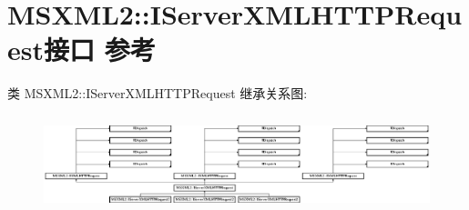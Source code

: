 \hypertarget{interface_m_s_x_m_l2_1_1_i_server_x_m_l_h_t_t_p_request}{}\section{M\+S\+X\+M\+L2\+:\+:I\+Server\+X\+M\+L\+H\+T\+T\+P\+Request接口 参考}
\label{interface_m_s_x_m_l2_1_1_i_server_x_m_l_h_t_t_p_request}
类 M\+S\+X\+M\+L2\+:\+:I\+Server\+X\+M\+L\+H\+T\+T\+P\+Request 继承关系图\+:\begin{figure}[H]
\begin{center}
\leavevmode
\includegraphics[height=2.840580cm]{interface_m_s_x_m_l2_1_1_i_server_x_m_l_h_t_t_p_request}
\end{center}
\end{figure}
